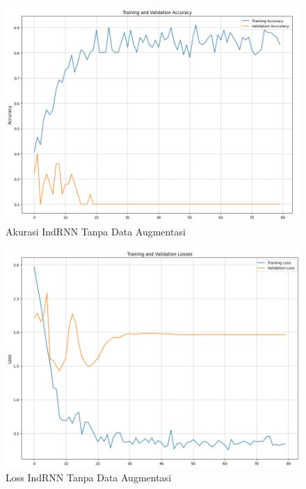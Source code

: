 \begin{figure} [H] \centering
  \includegraphics[scale=0.6]{gambar/AccIndRNNnoAug.png}
  \caption{Akurasi IndRNN Tanpa Data Augmentasi}
  \label{fig:AccIndRNNnoaug}
\end{figure}

\begin{figure} [H] \centering
  \includegraphics[scale=0.6]{gambar/LossIndRNNnoAug.png}
  \caption{Loss IndRNN Tanpa Data Augmentasi}
  \label{fig:LossIndRNNnoaug}
\end{figure}


